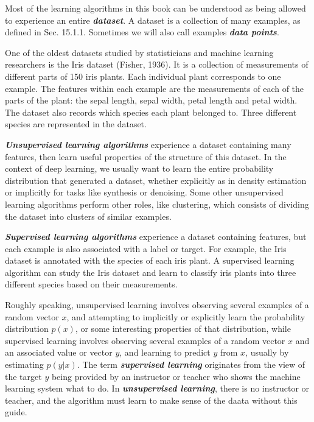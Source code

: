 \documentclass{report}
\begin{document}
\noindent Most of the learning algorithms in this book can be understood as being allowed to experience an entire \textbf{\textit{dataset}}. A dataset is a collection of many examples, as defined in Sec. 15.1.1. Sometimes we will also call examples \textbf{\textit{data points}}.\newline

\noindent One of the oldest datasets studied by statisticians and machine learning researchers is the Iris dataset (Fisher, 1936). It is a collection of measurements of different parts of 150 iris plants. Each individual plant corresponds to one example. The features within each example are the measurements of each of the parts of the plant: the sepal length, sepal width, petal length and petal width. The dataset also records which species each plant belonged to. Three different species are represented in the dataset.\newline

\noindent \textbf{\textit{Unsupervised learning algorithms}} experience a dataset containing many features, then learn useful properties of the structure of this dataset. In the context of deep learning, we usually want to learn the entire probability distribution that generated a dataset, whether explicitly as in density estimation or implicitly for tasks like synthesis or denoising. Some other unsupervised learning algorithms perform other roles, like clustering, which consists of dividing the dataset into clusters of similar examples.\newline

\noindent \textbf{\textit{Supervised learning algorithms}} experience a dataset containing features, but each example is also associated with a label or target. For example, the Iris dataset is annotated with the species of each iris plant. A supervised learning algorithm can study the Iris dataset and learn to classify iris plants into three different species based on their measurements.\newline

\noindent Roughly speaking, unsupervised learning involves observing several examples of a random vector $x$, and attempting to implicitly or explicitly learn the probability distribution $p(x)$, or some interesting properties of that distribution, while supervised learning involves observing several examples of a random vector $x$ and an associated value or vector $y$, and learning to predict $y$ from $x$, usually by estimating $p(y|x)$. The term \textbf{\textit{supervised learning}} originates from the view of the target $y$ being provided by an instructor or teacher who shows the machine learning system what to do. In \textbf{\textit{unsupervised learning}}, there is no instructor or teacher, and the algorithm must learn to make sense of the daata without this guide.\newline
\end{document}
